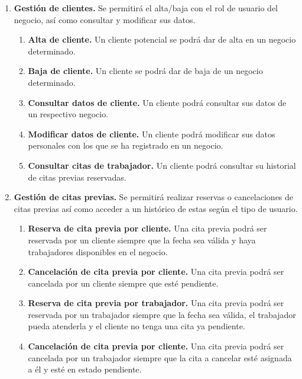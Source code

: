\begin{enumerate}[leftmargin=1.75cm,start=1,label={\bfseries RF-\arabic*.}]
    \item \textbf{Gestión de clientes.} Se permitirá el alta/baja con el rol de usuario del negocio,
    así como consultar y modificar sus datos.
    \begin{enumerate}[start=1,label={\bfseries RF-3.\arabic*.}]
        \item \textbf{Alta de cliente.} Un cliente potencial se podrá dar de alta en un negocio determinado.
        \item \textbf{Baja de cliente.} Un cliente se podrá dar de baja de un negocio determinado.
        \item \textbf{Consultar datos de cliente.} Un cliente podrá consultar sus datos de un respectivo negocio.
        \item \textbf{Modificar datos de cliente.} Un cliente podrá modificar sus datos personales con los que se ha
        registrado en un negocio.
        \item \textbf{Consultar citas de trabajador.} Un cliente podrá consultar su historial de citas previas
        reservadas.
    \end{enumerate}

    \item \textbf{Gestión de citas previas.} Se permitirá realizar reservas o cancelaciones de citas previas así como
    acceder a un histórico de estas según el tipo de usuario.
    \begin{enumerate}[start=1,label={\bfseries RF-4.\arabic*.}]
        \item \textbf{Reserva de cita previa por cliente.} Una cita previa podrá ser reservada por un cliente siempre
        que la fecha sea válida y haya trabajadores disponibles en el negocio.
        \item \textbf{Cancelación de cita previa por cliente.} Una cita previa podrá ser cancelada por un cliente
        siempre que esté pendiente.
        \item \textbf{Reserva de cita previa por trabajador.} Una cita previa podrá ser reservada por un trabajador
        siempre que la fecha sea válida, el trabajador pueda atenderla y el cliente no tenga una cita ya pendiente.
        \item \textbf{Cancelación de cita previa por cliente.} Una cita previa podrá ser cancelada por un trabajador
        siempre que la cita a cancelar esté asignada a él y esté en estado pendiente.\\
    \end{enumerate}


\end{enumerate}
